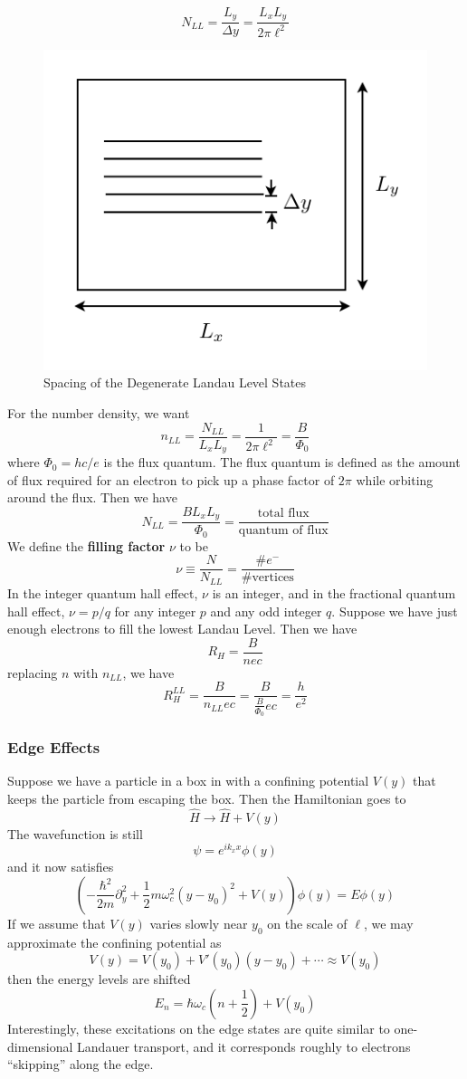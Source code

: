 \documentclass{article}
\begin{document}
	$$N_{LL}=\frac{L_y}{\Delta y}=\frac{L_xL_y}{2\pi\ell^2}$$
	\begin{figure}[h]
	\centering
		\includegraphics{landauDegeneracy.pdf}
		\caption{Spacing of the Degenerate Landau Level States}
		\label{landauDegeneracy}
	\end{figure}
	For the number density, we want
	$$n_{LL}=\frac{N_{LL}}{L_xL_y}=\frac{1}{2\pi\ell^2}=\frac{B}{\Phi_0}$$
	where $\Phi_0=hc/e$ is the flux quantum. The flux quantum is defined as the amount of flux required for an electron to pick up a phase factor of $2\pi$ while orbiting around the flux. Then we have
	$$N_{LL}=\frac{BL_xL_y}{\Phi_0}=\frac{\textrm{total flux}}{\textrm{quantum of flux}}$$ 
	We define the \textbf{filling factor} $\nu$ to be 
	$$\nu\equiv \frac{N}{N_{LL}}=\frac{\textrm{\#}e^{-}}{\textrm{\# vertices}}$$
	In the integer quantum hall effect, $\nu$ is an integer, and in the fractional quantum hall effect, $\nu=p/q$ for any integer $p$ and any odd integer $q$.
	Suppose we have just enough electrons to fill the lowest Landau Level. Then we have
	$$R_H=\frac{B}{nec}$$
	replacing $n$ with $n_{LL}$, we have 
	$$R_H^{LL}=\frac{B}{n_{LL}ec}=\frac{B}{\frac{B}{\Phi_0}ec}=\frac{h}{e^2}$$
	\subsubsection{Edge Effects}
	Suppose we have a particle in a box in with a confining potential $V(y)$ that keeps the particle from escaping the box. Then the Hamiltonian goes to
	$$\hat{H}\to\hat{H}+V(y)$$
	The wavefunction is still
	$$\psi=e^{ik_xx}\phi(y)$$
	and it now satisfies
	$$\left(-\frac{\hbar^2}{2m}\partial_y^2+\frac{1}{2}m\omega_c^2(y-y_0)^2+V(y)\right)\phi(y)=E\phi(y)$$
	If we assume that $V(y)$ varies slowly near $y_0$ on the scale of $\ell$, we may approximate the confining potential as
	$$V(y)=V(y_0)+V'(y_0)(y-y_0)+\cdots\approx V(y_0)$$
	then the energy levels are shifted
	$$E_n=\hbar\omega_c\left(n+\frac{1}{2}\right)+V(y_0)$$
	Interestingly, these excitations on the edge states are quite similar to one-dimensional Landauer transport, and it corresponds roughly to electrons ``skipping'' along the edge.
\end{document}
